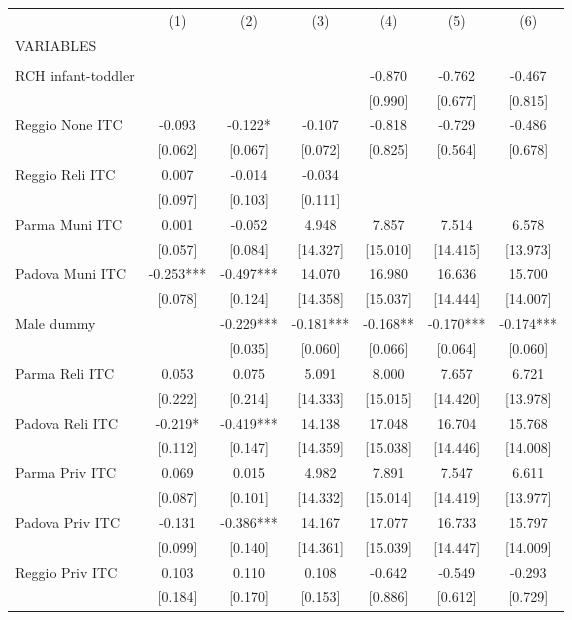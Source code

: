 \begin{tabular}{lcccccc} \hline
 & (1) & (2) & (3) & (4) & (5) & (6) \\
VARIABLES &  &  &  &  &  &  \\ \hline
 &  &  &  &  &  &  \\
RCH infant-toddler &  &  &  & -0.870 & -0.762 & -0.467 \\
 &  &  &  & [0.990] & [0.677] & [0.815] \\
Reggio None ITC & -0.093 & -0.122* & -0.107 & -0.818 & -0.729 & -0.486 \\
 & [0.062] & [0.067] & [0.072] & [0.825] & [0.564] & [0.678] \\
Reggio Reli ITC & 0.007 & -0.014 & -0.034 &  &  &  \\
 & [0.097] & [0.103] & [0.111] &  &  &  \\
Parma Muni ITC & 0.001 & -0.052 & 4.948 & 7.857 & 7.514 & 6.578 \\
 & [0.057] & [0.084] & [14.327] & [15.010] & [14.415] & [13.973] \\
Padova Muni ITC & -0.253*** & -0.497*** & 14.070 & 16.980 & 16.636 & 15.700 \\
 & [0.078] & [0.124] & [14.358] & [15.037] & [14.444] & [14.007] \\
Male dummy &  & -0.229*** & -0.181*** & -0.168** & -0.170*** & -0.174*** \\
 &  & [0.035] & [0.060] & [0.066] & [0.064] & [0.060] \\
Parma Reli ITC & 0.053 & 0.075 & 5.091 & 8.000 & 7.657 & 6.721 \\
 & [0.222] & [0.214] & [14.333] & [15.015] & [14.420] & [13.978] \\
Padova Reli ITC & -0.219* & -0.419*** & 14.138 & 17.048 & 16.704 & 15.768 \\
 & [0.112] & [0.147] & [14.359] & [15.038] & [14.446] & [14.008] \\
Parma Priv ITC & 0.069 & 0.015 & 4.982 & 7.891 & 7.547 & 6.611 \\
 & [0.087] & [0.101] & [14.332] & [15.014] & [14.419] & [13.977] \\
Padova Priv ITC & -0.131 & -0.386*** & 14.167 & 17.077 & 16.733 & 15.797 \\
 & [0.099] & [0.140] & [14.361] & [15.039] & [14.447] & [14.009] \\
Reggio Priv ITC & 0.103 & 0.110 & 0.108 & -0.642 & -0.549 & -0.293 \\
 & [0.184] & [0.170] & [0.153] & [0.886] & [0.612] & [0.729] \\

\end{tabular}
